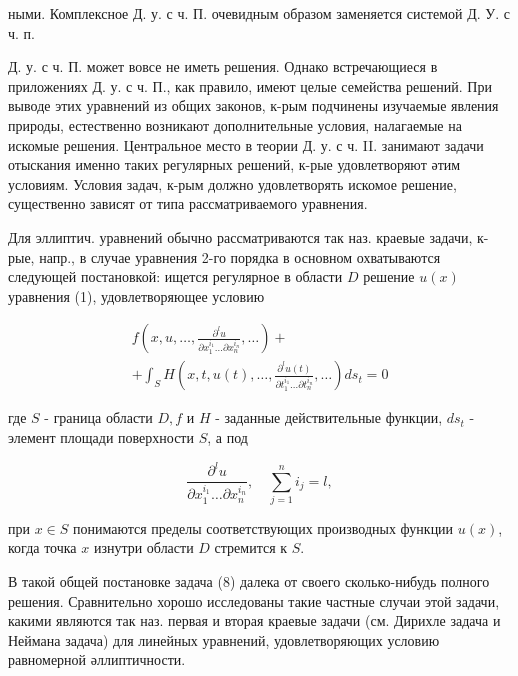 \documentclass[10pt]{article}
\begin{document}
ными. Комплексное Д. у. с ч. П. очевидным образом заменяется системой Д. У. с ч. п.



Д. у. с ч. П. может вовсе не иметь решения. Однако встречающиеся в приложениях Д. у. с ч. П., как правило, имеют целые семейства решений. При выводе этих уравнений из общих законов, к-рым подчинены изучаемые явления природы, естественно возникают дополнительные условия, налагаемые на искомые решения. Центральное место в теории Д. у. с ч. II. занимают задачи отыскания именно таких регулярных решений, к-рые удовлетворяют әтим условиям. Условия задач, к-рым должно удовлетворять искомое решение, существенно зависят от типа рассматриваемого уравнения.



Для эллиптич. уравнений обычно рассматриваются так наз. краевые задачи, к-рые, напр., в случае уравнения 2-го порядка в основном охватываются следующей постановкой: ищется регулярное в области $D$ решение $u(x)$ уравнения (1), удовлетворяющее условию



\[

\begin{gathered}

f\left(x, u, \ldots, \frac{\partial^{l} u}{\partial x_{1}^{i_{1}} \ldots \partial x_{n}^{i_{n}}}, \ldots\right)+ \\

+\int_{S} H\left(x, t, u(t), \ldots, \frac{\partial^{l} u(t)}{\partial t_{1}^{i_{1}} \ldots \partial t_{n}^{i_{n}}}, \ldots\right) d s_{t}=0

\end{gathered}

\]



где $S$ - граница области $D, f$ и $H$ - заданные действительные функции, $d s_{t}$ - элемент площади поверхности $S$, а под



\[

\frac{\partial^{l} u}{\partial x_{1}^{i_{1}} \ldots \partial x_{n}^{i_{n}}}, \quad \sum_{j=1}^{n} i_{j}=l,

\]



при $x \in S$ понимаются пределы соответствующих производных функции $u(x)$, когда точка $x$ изнутри области $D$ стремится к $S$.



В такой общей постановке задача (8) далека от своего сколько-нибудь полного решения. Сравнительно хорошо исследованы такие частные случаи этой задачи, какими являются так наз. первая и вторая краевые задачи (см. Дирихле задача и Неймана задача) для линейных уравнений, удовлетворяющих условию равномерной әллиптичности.
\end{document}
